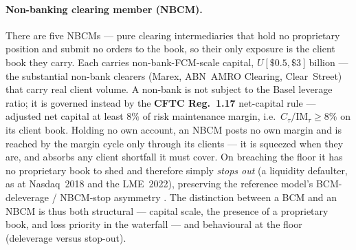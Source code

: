 \paragraph{Non-banking clearing member (NBCM).}
There are five NBCMs --- pure clearing intermediaries that hold no proprietary position and submit
no orders to the book, so their only exposure is the client book they carry. Each carries
non-bank-FCM-scale capital, $U[\$0.5,\$3]$\,billion \citep{cftc_fcm} --- the substantial non-bank
clearers (Marex, ABN~AMRO Clearing, Clear~Street) that carry real client volume. A non-bank is not
subject to the Basel leverage ratio; it is governed instead by the \textbf{CFTC Reg.~1.17}
net-capital rule --- adjusted net capital at least $8\%$ of risk maintenance margin, i.e.\
$C_\tau/\mathrm{IM}_\tau \ge 8\%$ on its client book. Holding no own account, an NBCM posts no own
margin and is reached by the margin cycle only through its clients --- it is squeezed when they are,
and absorbs any client shortfall it must cover. On breaching the floor it has no proprietary book to
shed and therefore simply \emph{stops out} (a liquidity defaulter, as at Nasdaq~2018 and the
LME~2022), preserving the reference model's BCM-deleverage / NBCM-stop asymmetry \citep{simudyne_odd}. The
distinction between a BCM and an NBCM is thus both structural --- capital scale, the presence of a
proprietary book, and loss priority in the waterfall --- and behavioural at the floor (deleverage
versus stop-out).


